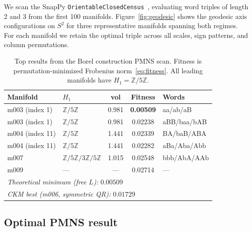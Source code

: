 \documentclass[11pt,a4paper]{article}
\newcommand{\Zfive}{\mathbb{Z}/5\mathbb{Z}}
\begin{document}
We scan the SnapPy \texttt{OrientableClosedCensus}~\cite{snappy},
evaluating word triples of length 2 and 3 from the first 100 manifolds. 
Figure~\ref{fig:geodesic} shows the geodesic axis configurations on $S^2$ for three representative manifolds spanning both regimes.
For each manifold we retain the optimal triple across all scales,
sign patterns, and column permutations.

\begin{table}[!t]
\centering
\caption{Top results from the Borel construction PMNS scan.
Fitness is permutation-minimized Frobenius norm~\eqref{eq:fitness}.
All leading manifolds have $H_1 = \Zfive$.}
\label{tab:pmns_results}
\begin{tabular}{llccl}
\toprule
Manifold & $H_1$ & vol & Fitness & Words \\
\midrule
m003 (index 1) & $\Zfive$        & 0.981 & \textbf{0.00509} & aa/ab/aB \\
m003 (index 1) & $\Zfive$        & 0.981 & 0.02238          & aBB/baa/bAB \\
m004 (index 11)& $\Zfive$        & 1.441 & 0.02339          & BA/baB/ABA \\
m004 (index 11)& $\Zfive$        & 1.441 & 0.02282          & aBa/Aba/Abb \\
m007           & $\Zfive/3\Zfive$& 1.015 & 0.02548          & bbb/AbA/AAb \\
m009           & ---             & ---   & 0.02714          & --- \\
\midrule
\multicolumn{5}{l}{\textit{Theoretical minimum (free $L$):} \quad $0.00509$} \\
\multicolumn{5}{l}{\textit{CKM best (m006, symmetric QR):} \quad $0.01729$} \\
\bottomrule
\end{tabular}
\end{table}

\subsection{Optimal PMNS result}
\end{document}
